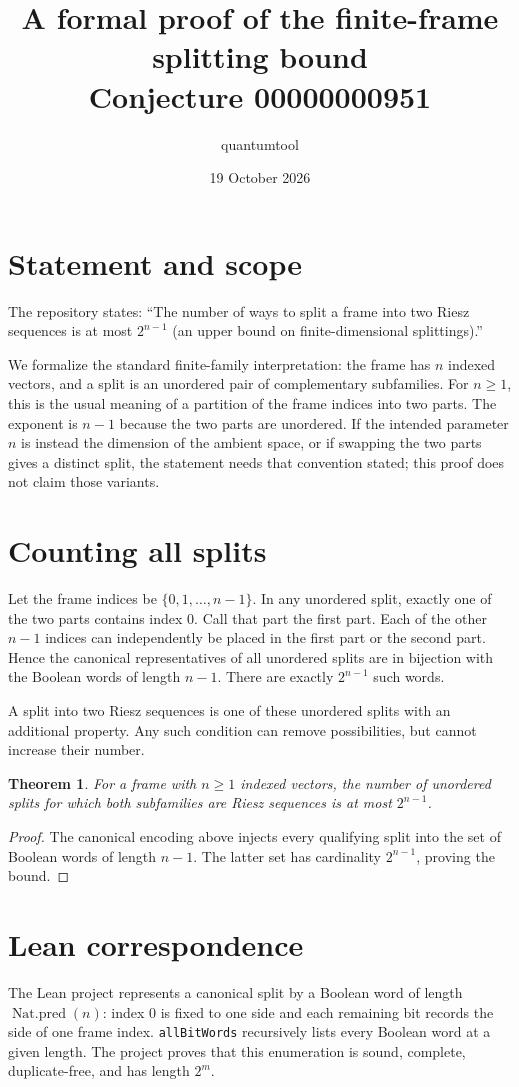 \documentclass[11pt]{article}
\title{A formal proof of the finite-frame splitting bound\\[2mm]\large Conjecture 00000000951}
\author{quantumtool}
\date{19 October 2026}
\newtheorem{theorem}{Theorem}
\begin{document}
\maketitle

\section*{Statement and scope}
The repository states: ``The number of ways to split a frame into two Riesz sequences is at most $2^{n-1}$ (an upper bound on finite-dimensional splittings).''

We formalize the standard finite-family interpretation: the frame has $n$ indexed vectors, and a split is an unordered pair of complementary subfamilies. For $n\geq 1$, this is the usual meaning of a partition of the frame indices into two parts. The exponent is $n-1$ because the two parts are unordered. If the intended parameter $n$ is instead the dimension of the ambient space, or if swapping the two parts gives a distinct split, the statement needs that convention stated; this proof does not claim those variants.

\section*{Counting all splits}
Let the frame indices be $\{0,1,\ldots,n-1\}$. In any unordered split, exactly one of the two parts contains index $0$. Call that part the first part. Each of the other $n-1$ indices can independently be placed in the first part or the second part. Hence the canonical representatives of all unordered splits are in bijection with the Boolean words of length $n-1$. There are exactly $2^{n-1}$ such words.

A split into two Riesz sequences is one of these unordered splits with an additional property. Any such condition can remove possibilities, but cannot increase their number.

\begin{theorem}
For a frame with $n\geq 1$ indexed vectors, the number of unordered splits for which both subfamilies are Riesz sequences is at most $2^{n-1}$.
\end{theorem}
\begin{proof}
The canonical encoding above injects every qualifying split into the set of Boolean words of length $n-1$. The latter set has cardinality $2^{n-1}$, proving the bound.
\end{proof}

\section*{Lean correspondence}
The Lean project represents a canonical split by a Boolean word of length $\operatorname{Nat.pred}(n)$: index $0$ is fixed to one side and each remaining bit records the side of one frame index. \verb|allBitWords| recursively lists every Boolean word at a given length. The project proves that this enumeration is sound, complete, duplicate-free, and has length $2^m$.
\end{document}
